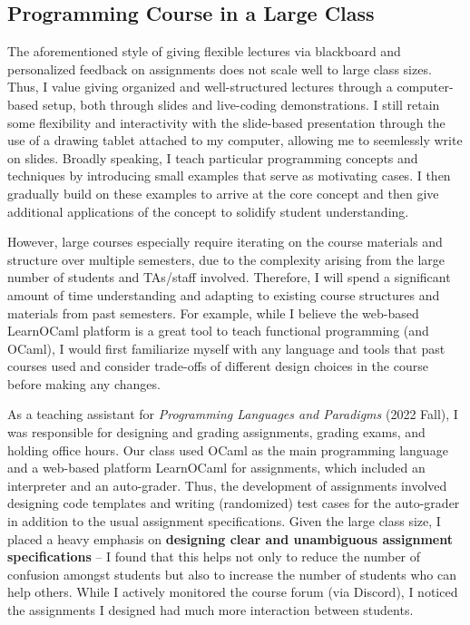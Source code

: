 \documentclass[11pt]{article}
\begin{document}
\subsection*{Programming Course in a Large Class}
The aforementioned style of giving flexible lectures via blackboard and personalized feedback on assignments does not scale well to large class sizes.
Thus, I value giving organized and well-structured lectures through a computer-based setup, both through slides and live-coding demonstrations.
I still retain some flexibility and interactivity with the slide-based presentation through the use of a drawing tablet attached to my computer, allowing me to seemlessly write on slides.
Broadly speaking, I teach particular programming concepts and techniques by introducing small examples that serve as motivating cases.
I then gradually build on these examples to arrive at the core concept and then give additional applications of the concept to solidify student understanding.

However, large courses especially require iterating on the course materials and structure over multiple semesters, due to the complexity arising from the large number of students and TAs/staff involved.
Therefore, I will spend a significant amount of time understanding and adapting to existing course structures and materials from past semesters.
For example, while I believe the web-based LearnOCaml platform is a great tool to teach functional programming (and OCaml), I would first familiarize myself with any language and tools that past courses used and consider trade-offs of different design choices in the course before making any changes.

As a teaching assistant for \emph{Programming Languages and Paradigms} (2022 Fall), I was responsible for designing and grading assignments, grading exams, and holding office hours.
Our class used OCaml as the main programming language and a web-based platform LearnOCaml for assignments, which included an interpreter and an auto-grader.
Thus, the development of assignments involved designing code templates and writing (randomized) test cases for the auto-grader in addition to the usual assignment specifications.
Given the large class size, I placed a heavy emphasis on \textbf{designing clear and unambiguous assignment specifications} -- I found that this helps not only to reduce the number of confusion amongst students but also to increase the number of students who can help others.
While I actively monitored the course forum (via Discord), I noticed the assignments I designed had much more interaction between students.
\end{document}
